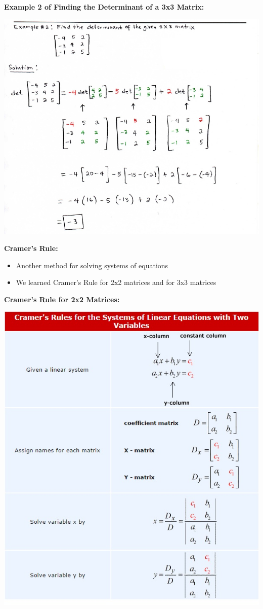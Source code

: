 \documentclass[12pt]{article}
\begin{document}
\newpage

\textbf{Example 2 of Finding the Determinant of a 3x3 Matrix:}

\centerline{\includegraphics[scale = 0.6]{Determinant3By3Example2.jpg}}


\textbf{Cramer's Rule:}

\begin{itemize}
\item Another method for solving systems of equations
\item We learned Cramer's Rule for 2x2 matrices and for 3x3 matrices
\end{itemize}

\newpage

\textbf{Cramer's Rule for 2x2 Matrices:}
\newline

\centerline{\includegraphics{CramersRule2By2.jpg}}
\end{document}
